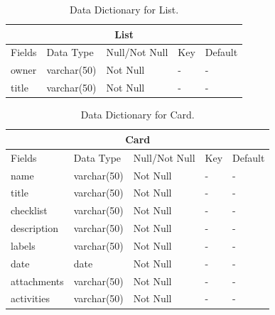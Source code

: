 \begin{table}[h]
\begin{tabular}[center]{|l|l|l|l|l|}
  \hline
  \multicolumn{5}{|c|}{List} \\
  \hline
  Fields & Data Type & Null/Not Null & Key & Default \\
  \hline
  owner & varchar(50) & Not Null & - & - \\
  title & varchar(50) & Not Null & - & - \\
  \hline
\end{tabular}
\caption{\label{tab:table-name}Data Dictionary for List.}
\end{table}

\vspace{10 mm}

\begin{table}[h]
\begin{tabular}[center]{|l|l|l|l|l|}
  \hline
  \multicolumn{5}{|c|}{Card} \\
  \hline
  Fields & Data Type & Null/Not Null & Key & Default \\
  \hline
  name & varchar(50) & Not Null & - & - \\
  title & varchar(50) & Not Null & - & - \\
  checklist & varchar(50) & Not Null & - & - \\
  description & varchar(50) & Not Null & - & - \\
  labels & varchar(50) & Not Null & - & - \\
  date & date & Not Null & - & - \\
  attachments & varchar(50) & Not Null & - & - \\
  activities & varchar(50) & Not Null & - & - \\
  \hline
\end{tabular}
\caption{\label{tab:table-name}Data Dictionary for Card.}
\end{table}
\vspace{10 mm}


